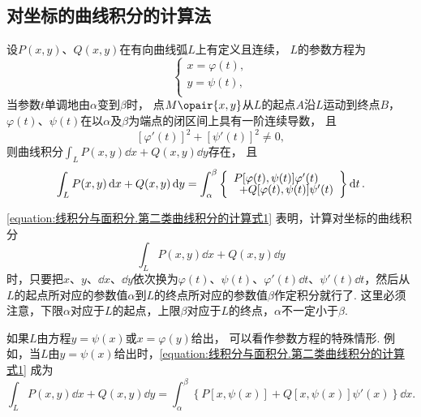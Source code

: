 \subsection{对坐标的曲线积分的计算法}
\begin{theorem}
设\(P(x,y)\)、\(Q(x,y)\)在有向曲线弧\(L\)上有定义且连续，%
\(L\)的参数方程为\[
\left\{ \begin{array}{l}
x = \varphi(t), \\
y = \psi(t), \\
\end{array} \right.
\]当参数\(t\)单调地由\(\alpha\)变到\(\beta\)时，%
点\(M\opair{x,y}\)从\(L\)的起点\(A\)沿\(L\)运动到终点\(B\)，%
\(\varphi(t)\)、\(\psi(t)\)在以\(\alpha\)及\(\beta\)为端点的闭区间上具有一阶连续导数，%
且\[
[\varphi'(t)]^2+[\psi'(t)]^2 \neq 0,
\]则曲线积分\(\int_L{P(x,y)\dd{x} + Q(x,y)\dd{y}}\)存在，%
且\begin{equation}\label{equation:线积分与面积分.第二类曲线积分的计算式1}
\int_L P(x,y) \dd{x} + Q(x,y) \dd{y}
= \int_{\alpha}^{\beta} \left\{ \def\arraystretch{.7}\begin{array}{l}
P[\varphi(t),\psi(t)] \varphi'(t) \\
\hspace{5pt}+ Q[\varphi(t),\psi(t)] \psi'(t)
\end{array} \right\} \dd{t}.
\end{equation}
\end{theorem}
\cref{equation:线积分与面积分.第二类曲线积分的计算式1} 表明，计算对坐标的曲线积分\[
\int_L P(x,y) \dd{x} + Q(x,y) \dd{y}
\]时，只要把\(x\)、\(y\)、\(\dd{x}\)、\(\dd{y}\)依次换为\(\varphi(t)\)、\(\psi(t)\)、\(\varphi'(t) \dd{t}\)、\(\psi'(t) \dd{t}\)，然后从\(L\)的起点所对应的参数值\(\alpha\)到\(L\)的终点所对应的参数值\(\beta\)作定积分就行了.
这里必须注意，下限\(\alpha\)对应于\(L\)的起点，上限\(\beta\)对应于\(L\)的终点，\(\alpha\)不一定小于\(\beta\).

如果\(L\)由方程\(y = \psi(x)\)或\(x = \varphi(y)\)给出，%
可以看作参数方程的特殊情形.
例如，当\(L\)由\(y = \psi(x)\)给出时，\cref{equation:线积分与面积分.第二类曲线积分的计算式1} 成为\[
\int_L P(x,y) \dd{x} + Q(x,y) \dd{y}
= \int_{\alpha}^{\beta} \left\{
	P[x,\psi(x)] + Q[x,\psi(x)] \psi'(x)
\right\} \dd{x}.
\]

